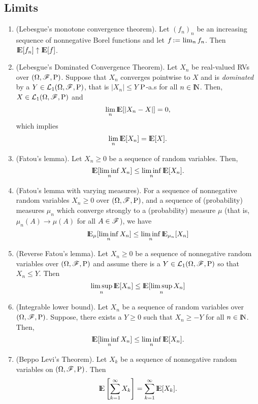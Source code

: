 \documentclass[a4paper,10pt]{article}
\begin{document}
\subsection{Limits}
\begin{enumerate}
 \item (Lebesgue's monotone convergence theorem). Let $(f_n)_n$ be an increasing sequence of 
       nonnegative Borel functions and let $f {}\mathop{\mathrel{:}=}{} \lim_n f_n$. Then $\E[f_n] \uparrow \E[f]$.
      
 \item 	(Lebesgue's Dominated Convergence Theorem). Let $X_n$ be real-valued RVs over $(\Omega,\mathscr{F},\mathrm{P})$. 
	Suppose that $X_n$ converges pointwise to $X$ and is \textit{dominated} by a 
	$Y\in\mathcal{L}_1(\Omega,\mathscr{F},\mathrm{P})$, that is $|X_n|\leq Y$ $\mathrm{P}$-a.s for all $n\in\N$. 
	Then, $X\in\mathcal{L}_1(\Omega,\mathscr{F},\mathrm{P})$
	and
	\[
	 \lim_n \E[|X_n-X|] = 0,
	\]
        which implies
        \[
         \lim_n \E[X_n] = \E[X].
        \]

 \item 	(Fatou's lemma). Let $X_n\geq 0$ be a sequence of random variables. 
	Then, 
	\[
	\E[\liminf_n X_n] \leq  \liminf_n \E[X_n].
	\]
 \item 	(Fatou's lemma with varying measures). For a sequence of nonnegative random variables $X_n\geq 0$ over $(\Omega,\mathscr{F},\mathrm{P})$,
	and a sequence of (probability) measures $\mu_n$ which converge strongly to a (probability)
	measure $\mu$ (that is, $\mu_n(A)\to\mu(A)$ for all $A\in\mathscr{F}$), we have
	\[
	 \E_\mu[\liminf_n X_n]\leq \liminf_n \E_{\mu_n}[ X_n]
	\]

 \item 	(Reverse Fatou's lemma). Let $X_n\geq 0$ be a sequence of nonnegative random variables over $(\Omega,\mathscr{F},\mathrm{P})$ and
	assume there is a $Y\in\mathcal{L}_1(\Omega,\mathscr{F},\mathrm{P})$ so that $X_n\leq Y$. Then
	\[ 
	 \limsup_n \E[X_n] \leq \E[\limsup_n X_n]
	\]
 \item (Integrable lower bound). 	
	Let $X_n$ be a sequence of random variables over $(\Omega,\mathscr{F},\mathrm{P})$. Suppose, there exists a
	$Y\geq 0$ such that $X_n\geq -Y$ for all $n\in\N$. Then,
	\[
	\E[\liminf_n X_n] \leq  \liminf_n \E[X_n].
	\]
 \item (Beppo Levi's Theorem).
	Let $X_k$ be a sequence of nonnegative random variables on $(\Omega,\mathscr{F},\mathrm{P})$. Then
	\[
	 \E \left[\sum_{k=1}^{\infty}X_k\right] = \sum_{k=1}^{\infty} \E[X_k].
	\]

\end{enumerate}
\end{document}
